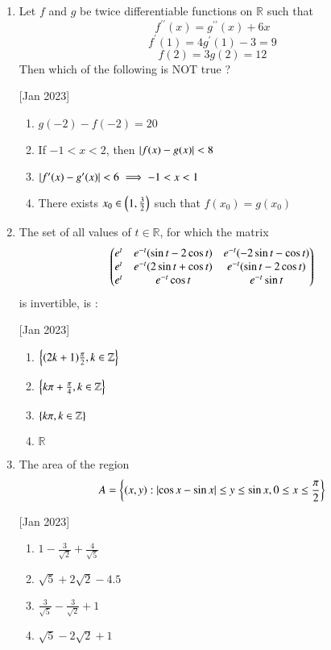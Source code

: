 \documentclass[journal,12pt,twocolumn]{IEEEtran}
\theoremstyle{remark}
\begin{document}
\begin{enumerate}
    \item Let $f$ and $g$ be twice differentiable functions on $\mathbb{R}$ such that
        $$f^{\prime\prime}(x)=g^{\prime\prime}(x)+6x$$
        $$f^\prime(1)=4g^\prime(1)-3=9$$
        $$f(2)=3g(2)=12$$
        Then which of the following is NOT true ?
    
    \hfill[Jan 2023]
        \begin{enumerate}
            \item $g(-2)-f(-2)=20$
            \item If $-1<x<2$, then $\left\vert f(x)-g(x)\right\vert<8$
            \item $\left\vert f^\prime(x)-g^\prime(x)\right\vert<6\implies-1<x<1$
            \item There exists $x_0\in\left(1,\frac{3}{2}\right)$ such that $f(x_0)=g(x_0)$
        \end{enumerate}


    \item The set of all values of $t\in\mathbb{R}$, for which the matrix $$\begin{pmatrix}e^t & e^{-t}(\sin{t}-2\cos{t}) & e^{-t}(-2\sin{t}-\cos{t}) \\ e^t & e^{-t}(2\sin{t}+\cos{t}) & e^{-t}(\sin{t}-2\cos{t}) \\ e^t & e^{-t}\cos{t} & e^{-t}\sin{t}\end{pmatrix}$$ is invertible, is :
    
    \hfill[Jan 2023]
        \begin{enumerate}
            \item $\left\{(2k+1)\frac{\pi}{2},k\in\mathbb{Z}\right\}$
            \item $\left\{k\pi+\frac{\pi}{4},k\in\mathbb{Z}\right\}$
            \item $\left\{k\pi,k\in\mathbb{Z}\right\}$
            \item $\mathbb{R}$
        \end{enumerate}


    \item The area of the region $$A=\left\{(x,y):\left\vert\cos x-\sin x\right\vert\leq y\leq\sin x, 0\leq x\leq\frac{\pi}{2}\right\}$$
    
    \hfill[Jan 2023]
        \begin{enumerate}
            \item $1 - \frac{3}{\sqrt{2}} + \frac{4}{\sqrt{5}}$
            \item $\sqrt{5} + 2\sqrt{2} - 4.5$
            \item $\frac{3}{\sqrt{5}} - \frac{3}{\sqrt{2}} + 1$
            \item $\sqrt{5} - 2\sqrt{2} + 1$
        \end{enumerate}


\end{enumerate}
\end{document}
